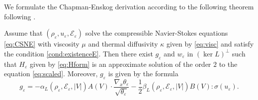 We formulate the Chapman-Enskog derivation according to the following theorem following \cite{Bardos1991Fluid}.
\begin{theorem}\label{th:CSNE}
Assume that $(\rho_\varepsilon,u_\varepsilon,\mathcal E_\varepsilon)$ solve the compressible Navier-Stokes equations \eqref{eq:CSNE} with   viscosity $\mu$ and thermal diffusivity $\kappa$ given by \eqref{eq:visc} and satisfy the condition \eqref{cond:existenceE}. Then there exist $g_\varepsilon$ and
$w_\varepsilon$ in $(\ker L)^\bot$ such that $H_\varepsilon$ given by \eqref{eq:Hform} is an approximate solution of the order $2$ to the equation \eqref{eq:scaled}. Moreover, $g_\varepsilon$ is given by the formula
\begin{equation}\label{eq:g}
g_\varepsilon= -\alpha_L(\rho_\varepsilon,\mathcal E_\varepsilon,|V|)A(V)\cdot \frac{\nabla_x\theta_\varepsilon}{\sqrt{\theta_\varepsilon}}-\frac 12\beta_L(\rho_\varepsilon,\mathcal E_\varepsilon,|V|)B(V):\sigma(u_\varepsilon).
\end{equation}
\end{theorem}
